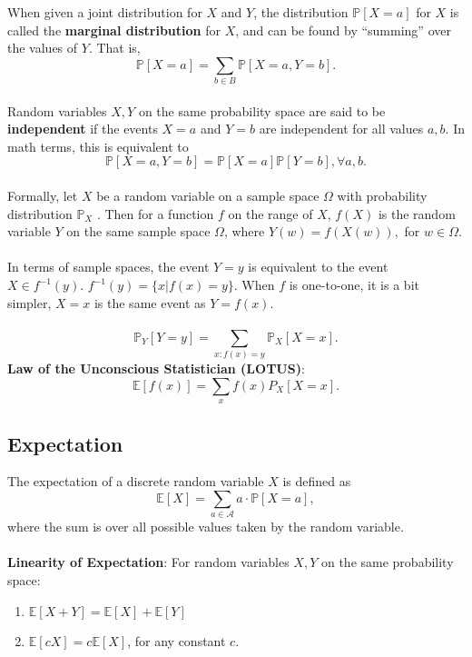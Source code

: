 \documentclass{article}
\theoremstyle{definition}
\begin{document}
When given a joint distribution for $X$ and $Y$, the distribution $\mathbb{P}[X = a]$ for $X$ is called the \textbf{marginal distribution} for $X$, and can be found by “summing” over the values of $Y$. That is, $$\mathbb{P}[X = a] = \sum_{b \in B} \mathbb{P}[X = a,Y = b].$$ \\
Random variables $X, Y$ on the same probability space are said to be \textbf{independent} if the events $X = a$ and $Y = b$ are independent for all values $a, b$. In math terms, this is equivalent to $$\mathbb{P}[X = a,Y = b] = \mathbb{P}[X = a]\mathbb{P}[Y = b], \forall a, b.$$ \\
Formally, let $X$ be a random variable on a sample space $\Omega$ with probability distribution $\mathbb{P}_X$ . Then for a function $f$ on the range of $X$, $f(X)$ is the random variable $Y$ on the same sample space $\Omega$, where $Y(w) = f(X(w)),$ for $w \in \Omega$. \\ \\
In terms of sample spaces, the event $Y = y$ is equivalent to the event $X \in f^{-1}(y)$. $f^{-1}(y) = \{x | f(x) = y\}$. When $f$ is one-to-one, it is a bit simpler, $X = x$ is the same event as $Y = f(x)$. \\ \\
$$\mathbb{P}_Y [Y = y] = \sum_{x: f(x)=y} \mathbb{P}_X [X = x].$$
\textbf{Law of the Unconscious Statistician (LOTUS)}: $$\mathbb{E}[f(x)] = \sum_x f(x)P_X [X = x].$$ 
\subsection*{Expectation}
The expectation of a discrete random variable $X$ is defined as $$\mathbb{E}[X] = \sum_{a \in \mathcal{A}} a \cdot \mathbb{P}[X = a],$$ where the sum is over all possible values taken by the random variable. \\ \\
\textbf{Linearity of Expectation}: For random variables $X, Y$ on the same probability space: \begin{enumerate}
    \item $\mathbb{E}[X + Y] = \mathbb{E}[X] + \mathbb{E}[Y]$
    \item $\mathbb{E}[cX] = c\mathbb{E}[X]$, for any constant $c$. 
\end{enumerate} $ $
\end{document}
